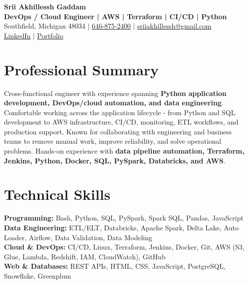 \documentclass[letterpaper,10pt]{article}
\begin{document}
\fontsize{9.35pt}{10.45pt}\selectfont

\begin{center}
    {\LARGE \textbf{Srii Akhillessh Gaddam}} \\[-1pt]
    \textbf{DevOps / Cloud Engineer | AWS | Terraform | CI/CD | Python} \\[2pt]
    Southfield, Michigan 48034 $|$
    \href{tel:6468752400}{646-875-2400} $|$
    \href{mailto:sriiakhillessh@gmail.com}{sriiakhillessh@gmail.com} \\[1pt]
    \href{https://www.linkedin.com/in/srii-akhiilessh-gaddam-b48668191/}{LinkedIn} $|$
    \href{https://sriiakhillesshg.github.io/portfolio/}{Portfolio}
\end{center}
\vspace{-8pt}

\section{Professional Summary}
\small{Cross-functional engineer with experience spanning \textbf{Python application development, DevOps/cloud automation, and data engineering}. Comfortable working across the application lifecycle - from Python and SQL development to AWS infrastructure, CI/CD, monitoring, ETL workflows, and production support. Known for collaborating with engineering and business teams to remove manual work, improve reliability, and solve operational problems. Hands-on experience with \textbf{data pipeline automation, Terraform, Jenkins, Python, Docker, SQL, PySpark, Databricks, and AWS}.}

\section{Technical Skills}
\small{
\textbf{Programming:} Bash, Python, SQL, PySpark, Spark SQL, Pandas, JavaScript \\
\textbf{Data Engineering:} ETL/ELT, Databricks, Apache Spark, Delta Lake, Auto Loader, Airflow, Data Validation, Data Modeling \\
\textbf{Cloud \& DevOps:} CI/CD, Linux, Terraform, Jenkins, Docker, Git, AWS (S3, Glue, Lambda, Redshift, IAM, CloudWatch), GitHub \\
\textbf{Web \& Databases:} REST APIs, HTML, CSS, JavaScript, PostgreSQL, Snowflake, Greenplum
}
\end{document}
